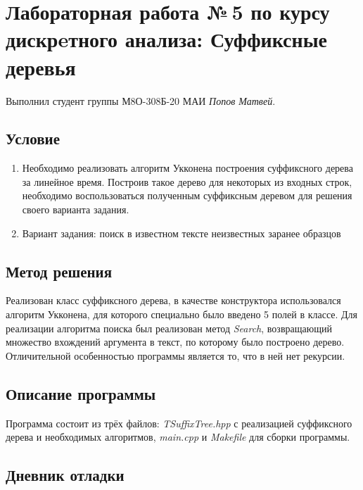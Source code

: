 \documentclass[12pt]{article}
\begin{document}
    \section*{Лабораторная работа №\,5 по курсу дискрeтного анализа: 
    Суффиксные деревья}

    Выполнил студент группы М8О-308Б-20 МАИ \textit{Попов Матвей}.

    \subsection*{Условие}
 
    \begin{enumerate}
    \item Необходимо реализовать алгоритм Укконена построения суффиксного
    дерева за линейное время. Построив такое дерево для некоторых из
    входных строк, необходимо воспользоваться полученным суффиксным
    деревом для решения своего варианта задания.
    \item Вариант задания: поиск в известном тексте неизвестных заранее образцов
    \end{enumerate}

    \subsection*{Метод решения}

    Реализован класс суффиксного дерева, в качестве конструктора использовался
    алгоритм Укконена, для которого специально было введено 5 полей в классе.
    Для реализации алгоритма поиска был реализован метод \textit{Search}, 
    возвращающий множество вхождений аргумента в текст, по которому было 
    построено дерево. Отличительной особенностью программы является то, что в 
    ней нет рекурсии.

    \subsection*{Описание программы}

    Программа состоит из трёх файлов: \textit{TSuffixTree.hpp} с реализацией 
    суффиксного дерева и необходимых алгоритмов, \textit{main.cpp} и 
    \textit{Makefile} для сборки программы.

    \subsection*{Дневник отладки}
\end{document}
